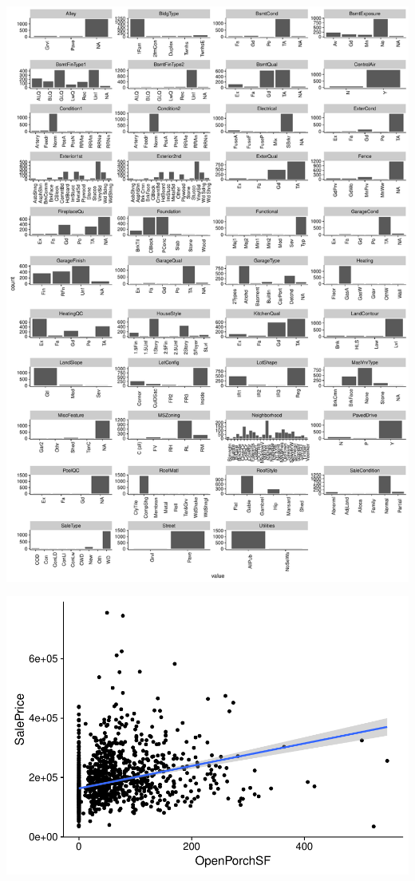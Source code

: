 \documentclass[]{article}
\begin{document}
\includegraphics{DATA_605_Final_Exam_files/figure-latex/bar-charts-1.pdf}

\includegraphics{DATA_605_Final_Exam_files/figure-latex/scatter-xy-1.pdf}
\end{document}
